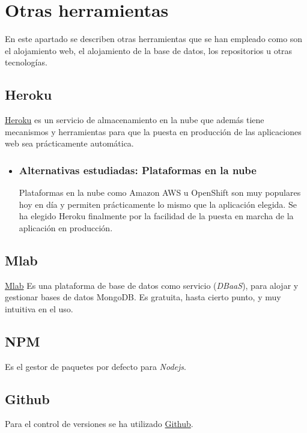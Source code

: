   \section{Otras herramientas}\label{otrasherramientas}
En este apartado se describen otras herramientas que se han empleado como son el alojamiento web, el alojamiento de la base de datos, los repositorios u otras tecnologías.

 \subsection{Heroku}\label{otrasherramientas_heroku}
\hyperlink{https://www.heroku.com/}{Heroku}  es un servicio de almacenamiento en la nube que además tiene mecanismos y herramientas para que la puesta en producción de las aplicaciones web sea prácticamente automática.

 \begin{itemize}
 	\item 	 \subsubsection{Alternativas estudiadas: Plataformas en la nube}\label{tnube}
  Plataformas en la nube como Amazon AWS u OpenShift son muy populares hoy en día y permiten prácticamente lo mismo que la aplicación elegida. Se ha elegido Heroku finalmente por la facilidad de la puesta en marcha de la aplicación en producción.
\end{itemize}



  
 \subsection{Mlab}\label{otrasherramientas_mlab}
 \hyperlink{https://mlab.com/}{Mlab} Es una plataforma de base de datos como servicio (\emph{DBaaS}), para alojar y gestionar bases de datos MongoDB. Es gratuita, hasta cierto punto, y muy intuitiva en el uso.


 
  
   \subsection{NPM}\label{otrasherramientas_npm}
Es el gestor de paquetes por defecto para \emph{Nodejs}.
  
   \subsection{Github}\label{otrasherramientas_github}
   Para el control de versiones se ha utilizado \hyperlink{https://www.github.com/}{Github}. 
   
